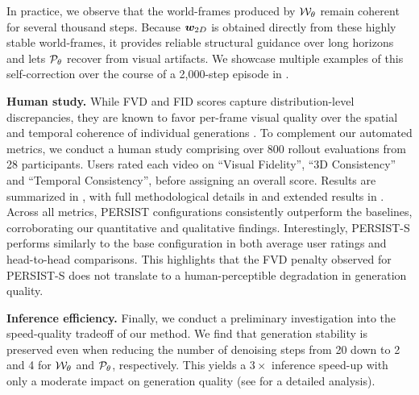 In practice, we observe that the world-frames produced by ${\mathcal{W}}_\theta$ remain coherent for several thousand steps. Because ${\bm{w}}_{2D}$ is obtained directly from these highly stable world-frames, it provides reliable structural guidance over long horizons and lets ${\mathcal{P}}_\theta$ recover from visual artifacts. We showcase multiple examples of this self-correction over the course of a 2,000-step episode in .

\textbf{Human study.} While FVD and FID scores capture distribution-level discrepancies, they are known to favor per-frame visual quality over the spatial and temporal coherence of individual generations \citep{ge2024content}. To complement our automated metrics, we conduct a human study comprising over 800 rollout evaluations from 28 participants. Users rated each video on ``Visual Fidelity'', ``3D Consistency'' and ``Temporal Consistency'', before assigning an overall score. Results are summarized in , with full methodological details in  and extended results in . Across all metrics, PERSIST configurations consistently outperform the baselines, corroborating our quantitative and qualitative findings. Interestingly, PERSIST-S performs similarly to the base configuration in both average user ratings and head-to-head comparisons. This highlights that the FVD penalty observed for PERSIST-S does not translate to a human-perceptible degradation in generation quality.

\textbf{Inference efficiency.} Finally, we conduct a preliminary investigation into the speed-quality tradeoff of our method. We find that generation stability is preserved even when reducing the number of denoising steps from 20 down to 2 and 4 for ${\mathcal{W}}_\theta$ and ${\mathcal{P}}_\theta$, respectively. This yields a $3\times$ inference speed-up with only a moderate impact on generation quality (see  for a detailed analysis).




